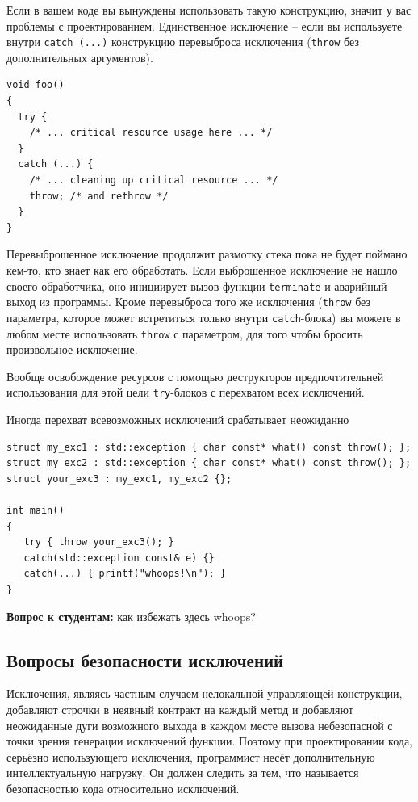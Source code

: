 \documentclass[a4paper,12pt,oneside]{article}
\newif\ifanswers
\begin{document}
Если в вашем коде вы вынуждены использовать такую конструкцию, значит у вас проблемы с проектированием. Единственное исключение -- если вы используете внутри \lstinline!catch (...)! конструкцию перевыброса исключения (\lstinline!throw! без дополнительных аргументов).

\begin{lstlisting}
void foo()
{
  try {
    /* ... critical resource usage here ... */
  }
  catch (...) {
    /* ... cleaning up critical resource ... */
    throw; /* and rethrow */
  }
}
\end{lstlisting}

Перевыброшенное исключение продолжит размотку стека пока не будет поймано кем-то, кто знает как его обработать. Если выброшенное исключение не нашло своего обработчика, оно инициирует вызов функции \lstinline!terminate! и аварийный выход из программы. Кроме перевыброса того же исключения (\lstinline!throw! без параметра, которое может встретиться только внутри \lstinline!catch!-блока) вы можете в любом месте использовать \lstinline!throw! с параметром, для того чтобы бросить произвольное исключение. 

Вообще освобождение ресурсов с помощью деструкторов предпочтительней использования для этой цели \lstinline!try!-блоков с перехватом всех исключений.

Иногда перехват всевозможных исключений срабатывает неожиданно

\begin{lstlisting}
struct my_exc1 : std::exception { char const* what() const throw(); };
struct my_exc2 : std::exception { char const* what() const throw(); };
struct your_exc3 : my_exc1, my_exc2 {};

int main()
{
   try { throw your_exc3(); }
   catch(std::exception const& e) {}
   catch(...) { printf("whoops!\n"); }
}
\end{lstlisting}

\textbf{Вопрос к студентам:} как избежать здесь whoops?

\ifanswers
Правильный ответ: виртуальное наследование.
\fi

\pagebreak
\subsection{Вопросы безопасности исключений}\label{ExceptionSafety}

Исключения, являясь частным случаем нелокальной управляющей конструкции, добавляют строчки в неявный контракт на каждый метод и добавляют неожиданные дуги возможного выхода в каждом месте вызова небезопасной с точки зрения генерации исключений функции. Поэтому при проектировании кода, серьёзно использующего исключения, программист несёт дополнительную интеллектуальную нагрузку. Он должен следить за тем, что называется безопасностью кода относительно исключений.
\end{document}
